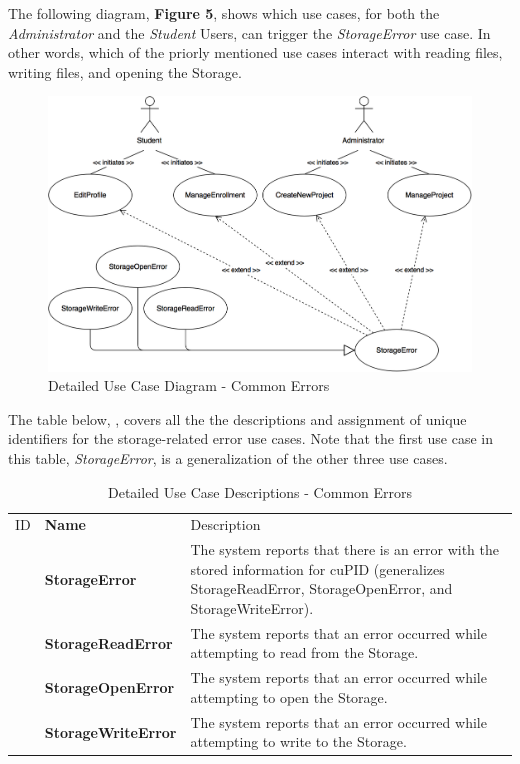 \documentclass[12pt,letterpaper]{article}
\begin{document}
The following diagram, {\bf Figure 5}, shows which use cases, for both the {\it Administrator} and the {\it Student} Users, can trigger the {\it StorageError} use case. In other words, which of the 
priorly mentioned use cases interact with reading files, writing files, and opening the Storage.

\begin{figure}[H]
	\centering{}
	\includegraphics[scale=0.3]{imgs/detailed-common-error-use-case-diagram.png}
	\caption{Detailed Use Case Diagram - Common Errors}
\end{figure}

The table below, , covers all the the descriptions and assignment of unique identifiers for the storage-related error use cases. Note that the first use case in this table, {\it StorageError}, is a generalization
of the other three use cases.

\begin{table}[H]
	\caption{Detailed Use Case Descriptions - Common Errors}
	\begin{tabu} to 
	    \tableheader{}ID & Name & Description\\
		\storageerror{} & StorageError &  The system reports that there is an error with the stored information for cuPID (generalizes StorageReadError, StorageOpenError, and StorageWriteError).\\
		\storagereaderror{} & StorageReadError & The system reports that an error occurred while attempting to read from the Storage.\\
		\storageopenerror{} & StorageOpenError & The system reports that an error occurred while attempting to open the Storage.\\
		\storagewriteerror{} & StorageWriteError & The system reports that an error occurred while attempting to write to the Storage.\\
	\end{tabu}
\end{table}
\end{document}
